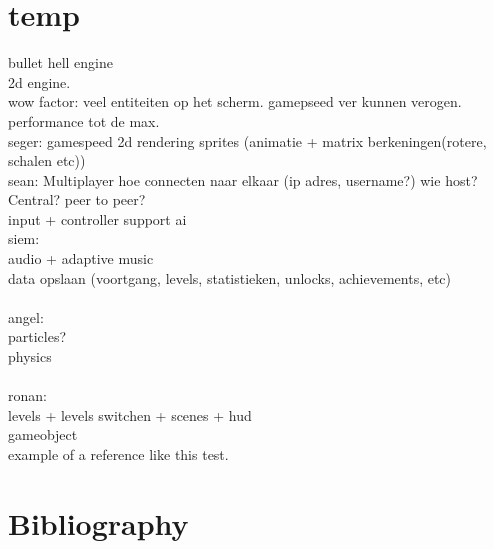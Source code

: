 \documentclass{article} %
\begin{document}
\newpage

\section{temp}
bullet hell engine
\\
2d engine.
\\
wow factor: veel entiteiten op het scherm. gamepseed ver kunnen verogen.
performance tot de max.
\\
seger:
gamespeed
2d rendering
sprites (animatie + matrix berkeningen(rotere, schalen etc))
\\
sean:
Multiplayer
hoe connecten naar elkaar (ip adres, username?)
wie host? Central? peer to peer?
\\
input + controller support
ai
\\
siem:\\
audio + adaptive music\\
data opslaan (voortgang, levels, statistieken, unlocks, achievements, etc)\\
\\
angel:\\
particles?\\
physics\\
\\
ronan:\\
levels + levels switchen + scenes + hud \\
gameobject
\\

example of a reference \cite{author2020} like this test.


\newpage

\section{Bibliography}
\printbibliography %
\newpage
\end{document}
